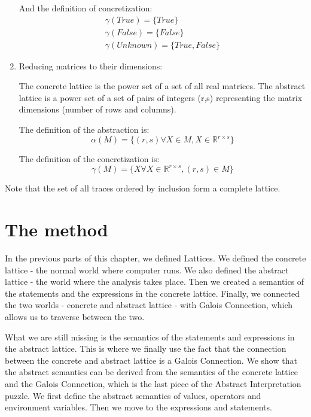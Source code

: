 \begin{enumerate}
    And the definition of concretization:
    \begin{gather*}
        \gamma(True) = \{True\}\\
        \gamma(False) = \{False\}\\
        \gamma(Unknown) = \{True, False\}
    \end{gather*}

    \item Reducing matrices to their dimensions:

    The concrete lattice is the power set of a set of all real matrices.
    The abstract lattice is a power set of a set of pairs of integers (r,s) representing the matrix dimensions (number
    of rows and columns).

    The definition of the abstraction is:
    \[\alpha(M) = \{(r, s) \forall X \in M, X \in \mathbb{R}^{r \times s}\}\]

    The definition of the concretization is:
    \[\gamma(M) = \{X \forall X \in \mathbb{R}^{r \times s}, (r,s) \in M\}\]
\end{enumerate}

Note that the set of all traces ordered by inclusion form a complete lattice.

\section{The method} %

In the previous parts of this chapter, we defined Lattices.
We defined the concrete lattice - the normal world where computer runs.
We also defined the abstract lattice - the world where the analysis takes place.
Then we created a semantics of the statements and the expressions in the concrete lattice.
Finally, we connected the two worlds - concrete and abstract lattice - with Galois Connection, which allows us to
traverse between the two.

What we are still missing is the semantics of the statements and expressions in the abstract lattice.
This is where we finally use the fact that the connection between the concrete and abstract lattice is a Galois
Connection.
We show that the abstract semantics can be derived from the semantics of the concrete lattice and the Galois Connection,
which is the last piece of the Abstract Interpretation puzzle.
We first define the abstract semantics of values, operators and environment variables.
Then we move to the expressions and statements.

